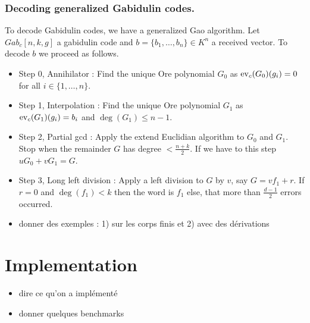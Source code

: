 \documentclass[a4paper]{llncs}
\def\todo#1{{\color{todo} #1}}
\newcommand{\ev}[1]{\textrm{\rm ev}_{#1}}
\begin{document}
\subsubsection*{Decoding generalized Gabidulin codes.}

To decode Gabidulin codes, we have a generalized Gao algorithm. Let $Gab_c[n,k,g]$ a gabidulin code and $b = \{b_1, \dots, b_n\} \in K^n$ a received vector. To decode $b$ we proceed as follows.

\begin{itemize}
\item Step 0, Annihilator : Find the unique Ore polynomial $G_0$ as $\ev{c}(G_0)(g_i) = 0$ for all $i \in \{1, \dots, n\}$.
\item Step 1, Interpolation : Find the unique Ore polynomial $G_1$ as $\ev{c}(G_1)(g_i) = b_i$ and $\deg(G_1) \leqslant n-1$.
\item Step 2, Partial gcd : Apply the extend Euclidian algorithm to $G_0$ and $G_1$. Stop when the remainder $G$ has degree $< \frac{n+k}{2}$. If we have to this step $uG_0 + vG_1 = G$.
\item Step 3, Long left division : Apply a left division to $G$ by $v$, say $G = vf_1 + r$. If $r =0$ and $\deg(f_1) < k$ then the word is $f_1$ else, that more than $\frac{d-1}{2}$ errors occurred. 
\end{itemize}


\todo{\begin{itemize}
\item donner des exemples : 1) sur les corps finis et 2) avec des dérivations
\end{itemize}}

\section{Implementation}

\todo{\begin{itemize}
\item dire ce qu'on a implémenté
\item donner quelques benchmarks
\end{itemize}}
\end{document}
